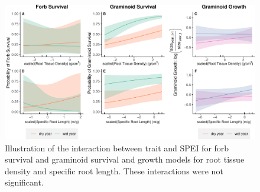 \documentclass[12pt, letterpaper]{article}
\begin{document}
\begin{figure}
\includegraphics[width=.8\textwidth]{suppObservationsFig-1.pdf}
\caption{\small{
Illustration of the interaction between trait and SPEI for forb survival and graminoid survival and growth models for root tissue density and specific root length. These interactions were not significant. 
}}
\label{fig:GramSurv_all}
\end{figure}
\end{document}
